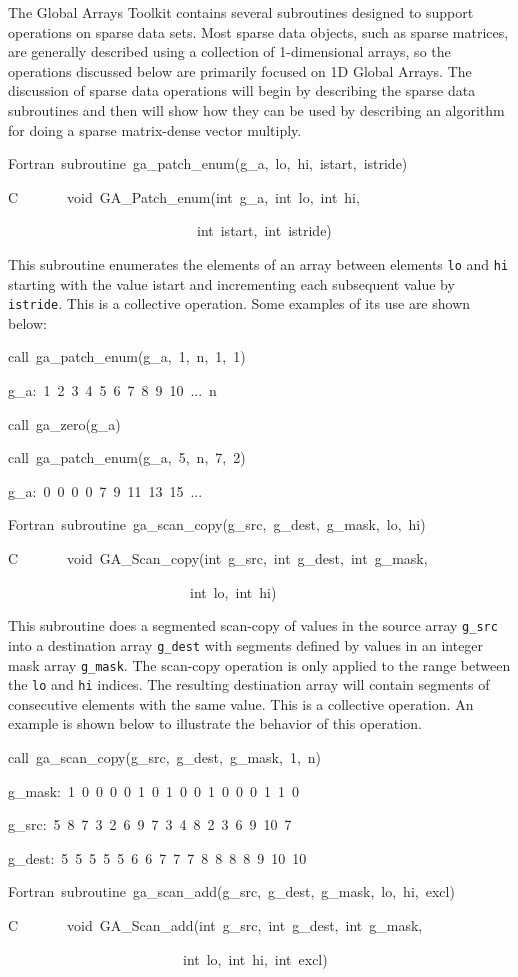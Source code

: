 The Global Arrays Toolkit contains several subroutines designed to
support operations on sparse data sets. Most sparse data objects,
such as sparse matrices, are generally described using a collection
of 1-dimensional arrays, so the operations discussed below are primarily
focused on 1D Global Arrays. The discussion of sparse data operations
will begin by describing the sparse data subroutines and then will
show how they can be used by describing an algorithm for doing a sparse
matrix-dense vector multiply.
\begin{lyxcode}
Fortran~subroutine~ga\_patch\_enum(g\_a,~lo,~hi,~istart,~istride)~

C~~~~~~~void~GA\_Patch\_enum(int~g\_a,~int~lo,~int~hi,~

~~~~~~~~~~~~~~~~~~~~~~~~~~~int~istart,~int~istride)
\end{lyxcode}
This subroutine enumerates the elements of an array between elements
\texttt{lo} and \texttt{hi} starting with the value istart and incrementing
each subsequent value by \texttt{istride}. This is a collective operation.
Some examples of its use are shown below:
\begin{lyxcode}
call~ga\_patch\_enum(g\_a,~1,~n,~1,~1)~

g\_a:~1~2~3~4~5~6~7~8~9~10~...~n

call~ga\_zero(g\_a)~

call~ga\_patch\_enum(g\_a,~5,~n,~7,~2)~

g\_a:~0~0~0~0~7~9~11~13~15~...

Fortran~subroutine~ga\_scan\_copy(g\_src,~g\_dest,~g\_mask,~lo,~hi)~

C~~~~~~~void~GA\_Scan\_copy(int~g\_src,~int~g\_dest,~int~g\_mask,~

~~~~~~~~~~~~~~~~~~~~~~~~~~int~lo,~int~hi)
\end{lyxcode}
This subroutine does a segmented scan-copy of values in the source
array \texttt{g\_src} into a destination array \texttt{g\_dest} with
segments defined by values in an integer mask array \texttt{g\_mask}.
The scan-copy operation is only applied to the range between the \texttt{lo}
and \texttt{hi} indices. The resulting destination array will contain
segments of consecutive elements with the same value. This is a collective
operation. An example is shown below to illustrate the behavior of
this operation. 
\begin{lyxcode}
call~ga\_scan\_copy(g\_src,~g\_dest,~g\_mask,~1,~n)~

g\_mask:~1~0~0~0~0~1~0~1~0~0~1~0~0~0~1~1~0~

g\_src:~5~8~7~3~2~6~9~7~3~4~8~2~3~6~9~10~7~

g\_dest:~5~5~5~5~5~6~6~7~7~7~8~8~8~8~9~10~10~



Fortran~subroutine~ga\_scan\_add(g\_src,~g\_dest,~g\_mask,~lo,~hi,~excl)~

C~~~~~~~void~GA\_Scan\_add(int~g\_src,~int~g\_dest,~int~g\_mask,~

~~~~~~~~~~~~~~~~~~~~~~~~~int~lo,~int~hi,~int~excl)
\end{lyxcode}

